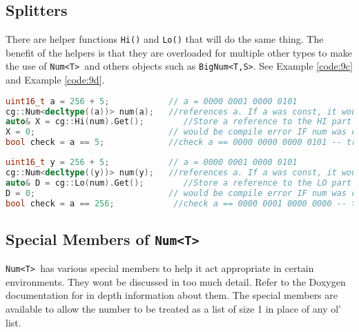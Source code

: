 \documentclass{article}
\newcommand{\theobj}{\protect\Verb+Num<T> +}
\begin{document}
\subsection{Splitters}

There are helper functions \Verb+Hi()+ and \Verb+Lo()+ that will do the same thing.  The benefit of the helpers is that they are overloaded for multiple other types to make the use of \theobj and others objects such as \Verb+BigNum<T,S>+. See Example \vref{code:9c} and Example \vref{code:9d}.

\begin{lstlisting}[language=C++, label=code:9c, caption=Hi members]
uint16_t a = 256 + 5;            // a = 0000 0001 0000 0101
cg::Num<decltype((a))> num(a);   //references a. If a was const, it would be a copy
auto& X = cg::Hi(num).Get();        //Store a reference to the HI part of num in X, also references the HI part of a (for this example).  If a was const, it would not reference the Hi part of a, only num
X = 0;                           // would be compile error IF num was const.  If num 
bool check = a == 5;             //check a == 0000 0000 0000 0101 -- true
\end{lstlisting}

\begin{lstlisting}[language=C++, label=code:9d, caption=Lo members]
uint16_t y = 256 + 5;            // a = 0000 0001 0000 0101
cg::Num<decltype((y))> num(y);   //references a. If a was const, it would be a copy
auto& D = cg::Lo(num).Get();        //Store a reference to the LO part of num in X, also references the Lo part of a (for this example).  If a was const, it would not reference the Lo part of a, only num
D = 0;                           // would be compile error IF num was const.  If num 
bool check = a == 256;            //check a == 0000 0001 0000 0000 -- true
\end{lstlisting}
\pagebreak
\subsection{Special Members of \theobj}

\theobj has various special members to help it act appropriate in certain environments.  They wont be discussed in too much detail. Refer to the Doxygen documentation for in depth information about them.  The special members are available to allow the number to be treated as a list of size 1 in place of any ol' list.
\end{document}
